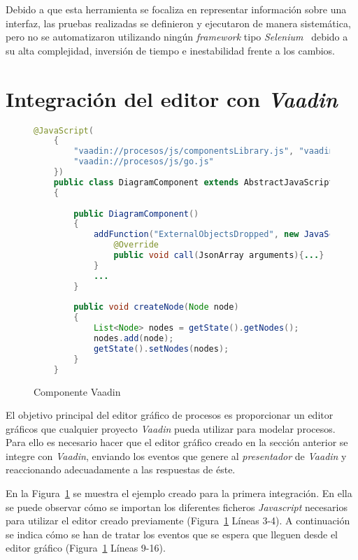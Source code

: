 
Debido a que esta herramienta se focaliza en representar información sobre una interfaz, las pruebas realizadas se definieron y ejecutaron de manera sistemática, pero no se automatizaron utilizando ningún \emph{framework} tipo \emph{Selenium}~\cite{} debido a su alta complejidad, inversión de tiempo e inestabilidad frente a los cambios.

\section{Integración del editor con \emph{Vaadin}}

\begin{figure}[H]
	\centering
	\begin{lstlisting}[language=Java]
	@JavaScript(
	{
		"vaadin://procesos/js/componentsLibrary.js", "vaadin://procesos/js/connectorSample.js",
		"vaadin://procesos/js/go.js"
	})
	public class DiagramComponent extends AbstractJavaScriptComponent
	{
	
		public DiagramComponent()
		{
			addFunction("ExternalObjectsDropped", new JavaScriptFunction(){
				@Override
				public void call(JsonArray arguments){...}
			}
			...
		}
		
		public void createNode(Node node)
		{
			List<Node> nodes = getState().getNodes();
			nodes.add(node);
			getState().setNodes(nodes);
		}
	}\end{lstlisting}
	\caption{Componente Vaadin}
	\label{fig:vaadinComponent}
\end{figure}


El objetivo principal del editor gráfico de procesos es proporcionar un editor gráficos que cualquier proyecto \emph{Vaadin} pueda utilizar para modelar procesos. Para ello es necesario hacer que el editor gráfico creado en la sección anterior se integre con \emph{Vaadin}, enviando los eventos que genere al \emph{presentador} de \emph{Vaadin} y reaccionando adecuadamente a las respuestas de éste. 

En la Figura~\ref{fig:vaadinComponent} se muestra el ejemplo creado para la primera integración. En ella se puede observar cómo se importan los diferentes ficheros \emph{Javascript} necesarios para utilizar el editor creado previamente (Figura~\ref{fig:vaadinComponent} Líneas 3-4). A continuación se indica cómo se han de tratar los eventos que se espera que lleguen desde el editor gráfico (Figura~\ref{fig:vaadinComponent} Líneas 9-16). 

